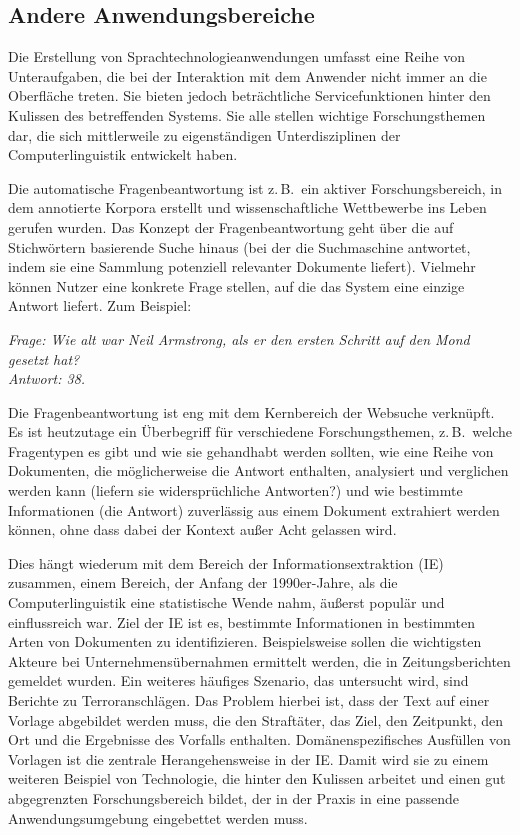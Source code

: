 \documentclass[]{../../metanetpaper}
\begin{document}
\begin{multicols}{2}
\subsection{Andere Anwendungsbereiche}

Die Erstellung von Sprachtechnologieanwendungen umfasst eine Reihe von Unteraufgaben, die bei der Interaktion mit dem Anwender nicht immer an die Oberfläche treten. Sie bieten jedoch beträchtliche Servicefunktionen hinter den Kulissen des betreffenden Systems. Sie alle stellen wichtige Forschungsthemen dar, die sich mittlerweile zu eigenständigen Unterdisziplinen der Computerlinguistik entwickelt haben. 


Die automatische Fragenbeantwortung ist z.\,B.~ein aktiver Forschungsbereich, in dem annotierte Korpora erstellt und wissenschaftliche Wettbewerbe ins Leben gerufen wurden. Das Konzept der Fragenbeantwortung geht über die auf Stichwörtern basierende Suche hinaus (bei der die Suchmaschine antwortet, indem sie eine Sammlung potenziell relevanter Dokumente liefert). Vielmehr können Nutzer eine konkrete Frage stellen, auf die das System eine einzige Antwort liefert. Zum Beispiel:

\textit{Frage: Wie alt war Neil Armstrong, als er den ersten Schritt auf den Mond gesetzt hat?}\\
\textit{Antwort: 38.}

Die Fragenbeantwortung ist eng mit dem Kernbereich der Websuche verknüpft. Es ist heutzutage ein Überbegriff für verschiedene Forschungsthemen, z.\,B.~welche Fragentypen es gibt und wie sie gehandhabt werden sollten, wie eine Reihe von Dokumenten, die möglicherweise die Antwort enthalten, analysiert und verglichen werden kann (liefern sie widersprüchliche Antworten?) und wie bestimmte Informationen (die Antwort) zuverlässig aus einem Dokument extrahiert werden können, ohne dass dabei der Kontext außer Acht gelassen wird. 

Dies hängt wiederum mit dem Bereich der Informationsextraktion (IE) zusammen, einem Bereich, der Anfang der 1990er-Jahre, als die Computerlinguistik eine statistische Wende nahm, äußerst populär und einflussreich war. Ziel der IE ist es, bestimmte Informationen in bestimmten Arten von Dokumenten zu identifizieren. Beispielsweise sollen die wichtigsten Akteure bei Unternehmensübernahmen ermittelt werden, die in Zeitungsberichten gemeldet wurden. Ein weiteres häufiges Szenario, das untersucht wird, sind Berichte zu Terroranschlägen. Das Problem hierbei ist, dass der Text auf einer Vorlage abgebildet werden muss, die den Straftäter, das Ziel, den Zeitpunkt, den Ort und die Ergebnisse des Vorfalls enthalten. Domänenspezifisches Ausfüllen von Vorlagen ist die zentrale Herangehensweise in der IE. Damit wird sie zu einem weiteren Beispiel von Technologie, die hinter den Kulissen arbeitet und einen gut abgegrenzten Forschungsbereich bildet, der in der Praxis in eine passende Anwendungsumgebung eingebettet werden muss. 


\end{multicols}
\end{document}
